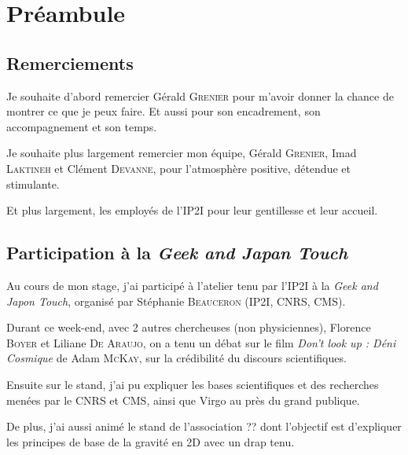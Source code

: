 
\chapter*{Préambule}

\section*{Remerciements}

Je souhaite d'abord remercier Gérald \textsc{Grenier} pour m'avoir donner la chance de montrer ce que je peux faire. Et aussi pour son encadrement, son accompagnement et son temps.

Je souhaite plus largement remercier mon équipe, Gérald \textsc{Grenier}, Imad \textsc{Laktineh} et Clément \textsc{Devanne}, pour l'atmosphère positive, détendue et stimulante.

Et plus largement, les employés de l'IP2I pour leur gentillesse et leur accueil.

\section*{Participation à la \textit{Geek and Japan Touch}}

Au cours de mon stage, j'ai participé à l'atelier tenu par l'IP2I à la \textit{Geek and Japon Touch}, organisé par Stéphanie \textsc{Beauceron} (IP2I, CNRS, CMS).

Durant ce week-end, avec 2 autres chercheuses (non physiciennes), Florence \textsc{Boyer} et Liliane \textsc{De Araujo}, on a tenu un débat sur le film \textit{Don't look up : Déni Cosmique} de Adam \textsc{McKay}, sur la crédibilité du discours scientifiques.

Ensuite sur le stand, j'ai pu expliquer les bases scientifiques et des recherches menées par le CNRS et CMS, ainsi que Virgo au près du grand publique. 

De plus, j'ai aussi animé le stand de l'association ?? dont l'objectif est d'expliquer les principes de base de la gravité en 2D avec un drap tenu.
